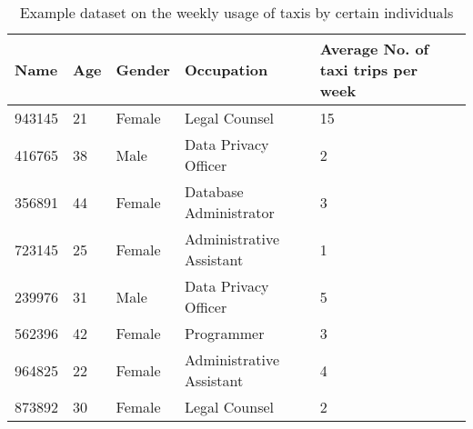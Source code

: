 \documentclass[11pt,letterpaper]{article}
\begin{document}
	\begin{table}[h!]
		\caption{Example dataset on the weekly usage of taxis by certain individuals
		} \label{tab:SampleData}
		\begin{tabularx}{\columnwidth}{|p{2cm}|p{2cm}|p{3cm}|X|X|}
			\hline
			\textbf{Name} & \textbf{Age} & \textbf{Gender}  & \textbf{Occupation}  & \textbf{Average No. of taxi trips per week} \\
			\hline
			943145 & 21 & Female & Legal Counsel & 15\\\hline
			
			\hline
			416765 & 38 & Male & Data Privacy Officer & 2 \\\hline
			
			\hline
			356891 & 44 & Female & Database Administrator & 3 \\ \hline
			
			\hline
			723145 & 25 & Female & Administrative 
			Assistant & 1\\\hline
			
			\hline
			239976 & 31 & Male & Data Privacy Officer & 5 \\\hline
			
			\hline
			562396 & 42 & Female & Programmer & 3\\ \hline
			
			\hline
			964825 & 22 & Female & Administrative 
			Assistant & 4 \\ \hline
			
			\hline
			873892 & 30 & Female & Legal Counsel & 2\\ \hline
			
		\end{tabularx}
	\end{table}
	
\end{document}
